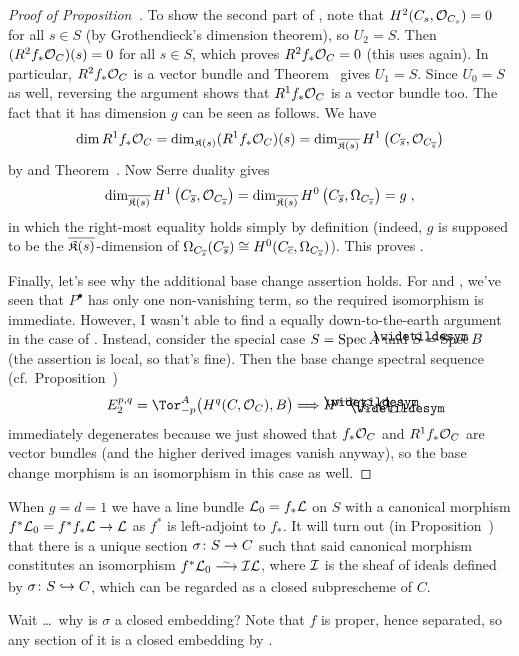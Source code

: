\documentclass[a4paper,parskip=half,numbers=enddot, DIV=12]{scrreprt}
\begin{document}
\begin{proof}[Proof of Proposition~]
	To show the second part of , note that $H^2(C_s,\mathcal{O}_{C_s})=0$ for all $s\in S$ (by Grothendieck's dimension theorem), so $U_2=S$. Then $(R^2f_*\mathcal{O}_C)(s)=0$ for all $s\in S$, which proves $R^2f_*\mathcal{O}_C=0$ (this uses \cite[Lemma~1.5.1]{alg2} again). In particular, $R^2f_*\mathcal{O}_C$ is a vector bundle and Theorem~ gives $U_1=S$. Since $U_0=S$ as well, reversing the argument shows that $R^1f_*\mathcal{O}_C$ is a vector bundle too. The fact that it has dimension $g$ can be seen as follows. We have
	\begin{align*}
		\dim R^1f_*\mathcal{O}_C=\dim_{\mathfrak{K}(s)}(R^1f_*\mathcal{O}_C)(s)=\dim_{\overline{\mathfrak{K}(s)}}H^1\left(C_{\overline{s}},\mathcal{O}_{C_{\overline{s}}}\right)
	\end{align*}
	by  and Theorem~. Now Serre duality gives
	\begin{align*}
		\dim_{\overline{\mathfrak{K}(s)}}H^1\left(C_{\overline{s}},\mathcal{O}_{C_{\overline{s}}}\right)=\dim_{\overline{\mathfrak{K}(s)}}H^0\left(C_{\overline{s}},\Omega_{C_{\overline{s}}}\right)=g\;,
	\end{align*}
	in which the right-most equality holds simply by definition (indeed, $g$ is supposed to be the $\overline{\mathfrak{K}(s)}$-dimension of $\Omega_{C_{\overline{s}}}(C_{\overline{s}})\cong H^0(C_{\overline{c}},\Omega_{C_{\overline{s}}})$). This proves .
	
	Finally, let's see why the additional base change assertion holds. For  and , we've seen that $P^\bullet$ has only one non-vanishing term, so the required isomorphism is immediate. However, I wasn't able to find a equally down-to-the-earth argument in the case of . Instead, consider the special case $S=\operatorname{Spec} A$ and $\snake{S}=\Spec B$ (the assertion is local, so that's fine). Then the base change spectral sequence (cf.\ Proposition~)
	\begin{align*}
		E_2^{p,q}=\Tor_{-p}^A\big(H^q(C,\Oo_C),B\big)\converge H^{p+q}(\snake{C},\Oo_{\snake{C}})\;.
	\end{align*}
	immediately degenerates because we just showed that $f_*\mathcal{O}_C$ and $R^1f_*\mathcal{O}_C$ are vector bundles (and the higher derived images vanish anyway), so the base change morphism is an isomorphism in this case as well.
\end{proof}
\begin{rem}
	When $g=d=1$ we have a line bundle $\mathcal{L}_0=f_*\mathcal{L}$ on $S$ with a canonical morphism $f^*\Ll_0=f^*f_*\Ll\morphism\Ll$ as $f^*$ is left-adjoint to $f_*$. It will turn out (in Proposition~) that there is a unique section $\sigma\colon S\morphism C$ such that said canonical morphism constitutes an isomorphism $f^*\Ll_0\isomorphism\Ii\Ll$, where $\mathcal{I}$ is the sheaf of ideals defined by $\sigma\colon S\monomorphism C$, which can be regarded as a closed subprescheme of $C$.
	
	Wait \ldots\ why is $\sigma$ a closed embedding? Note that $f$ is proper, hence separated, so any section of it is a closed embedding by \cite[Proposition~1.5.5]{alggeo1}.
\end{rem}
\end{document}

